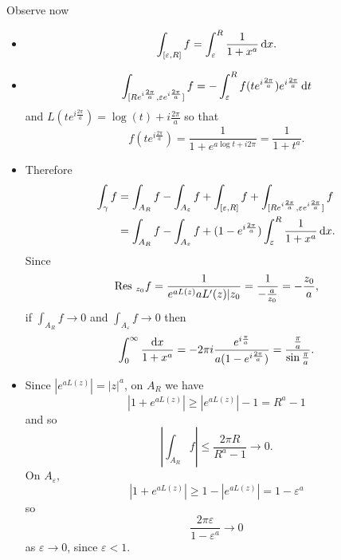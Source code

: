 \begin{xmpl}
  Observe now
  \begin{itemize}
    \item{
      $$
        \int_{[\varepsilon, R]} f
      = \int_\varepsilon^R
          \frac{1}{1 + x^a}
          \mathop{}\!\mathrm{d} x.
      $$
    }
    \item{
      $$
         \int_{[R e^{i \frac{2\pi}{a}},
                \varepsilon e^{i \frac{2\pi}{a}}]}
           f
       = -\int_{\varepsilon}^R
            f(te^{i \frac{2\pi}{a}}) e^{i \frac{2\pi}{a}}
            \mathop{}\!\mathrm{d} t
      $$
      and $L(te^{i \frac{2\pi}{a}}) = \log(t) + i \frac{2\pi}{a}$
      so that
      $$
        f(t e^{i \frac{2 \pi}{a}})
      = \frac{1}{1 + e^{a \log t + i 2 \pi}}
      = \frac{1}{1 + t^a}.
      $$
    }
    \item{
      Therefore
      \begin{align*}
          \int_{\gamma} f
       &= \int_{A_R} f
        - \int_{A_\varepsilon} f
        + \int_{[\varepsilon, R]} f
        + \int_{[R e^{i \frac{2\pi}{a}},
                \varepsilon e^{i \frac{2 \pi}{a}}]}
             f \\
       &= \int_{A_R} f
        - \int_{A_\varepsilon} f
        + (1 - e^{i \frac{2\pi}{a}})
          \int_\varepsilon^R
            \frac{1}{1 + x^a}
            \mathop{}\!\mathrm{d} x.
      \end{align*}
      Since
      $$
          \mathrm{Res}~_{z_0} f
        = \frac{1}
               {e^{a L(z)} a L^\prime(z)|z_0}
        = \frac{1}
               {-\frac{a}{z_0}} = -\frac{z_0}{a},
      $$
      if $\int_{A_R} f \to 0$ and $\int_{A_\varepsilon} f \to 0$
      then
      $$
        \int_0^\infty
          \frac{\mathop{}\!\mathrm{d} x}{1 + x^a}
      = -2 \pi i \frac{e^{i\frac{\pi}{a}}}
                      {a(1 - e^{i\frac{2\pi}{a}})}
      = \frac{\frac{\pi}{a}}
             {\sin \frac{\pi}{a}}.
      $$
    }
    \item{
      Since $|e^{a L(z)}| = |z|^a$, on $A_R$ we have
      $$
      |1 + e^{a L(z)}| \geq |e^{a L(z)}| - 1 = R^a - 1
      $$
      and so
      $$
           \left|
             \int_{A_R} f
           \right|
      \leq \frac{2 \pi R}{R^a - 1}
      \to  0.
      $$
      On $A_\varepsilon$,
      $$
      |1 + e^{a L(z)}| \geq 1 - |e^{a L(z)}| = 1 - \varepsilon^a
      $$
      so
      $$
      \frac{2 \pi \varepsilon}{1 - \varepsilon^a} \to 0
      $$
      as $\varepsilon \to 0$, since $\varepsilon < 1$.
    }
  \end{itemize}
\end{xmpl}
